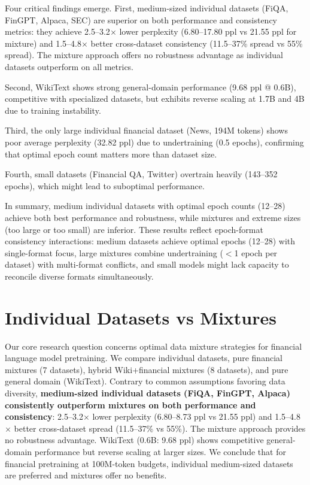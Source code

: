 Four critical findings emerge. First, {medium-sized individual datasets (FiQA, FinGPT, Alpaca, SEC) are superior on both performance and consistency metrics}: they achieve 2.5–3.2$\times$ lower perplexity (6.80–17.80 ppl vs 21.55 ppl for mixture) and 1.5–4.8$\times$ better cross-dataset consistency (11.5–37\% spread vs 55\% spread). The mixture approach offers no robustness advantage as individual datasets outperform on all metrics. 

Second, WikiText shows strong general-domain performance (9.68 ppl @ 0.6B), competitive with specialized datasets, but exhibits reverse scaling at 1.7B and 4B due to training instability. 

Third, the only large individual financial dataset (News, 194M tokens) shows poor average perplexity (32.82 ppl) due to undertraining (0.5 epochs), confirming that optimal epoch count matters more than dataset size. 

Fourth, small datasets (Financial QA, Twitter) overtrain heavily (143–352 epochs), which might lead to suboptimal performance. 

In summary, medium individual datasets with optimal epoch counts (12–28) achieve both best performance and robustness, while mixtures and extreme sizes (too large or too small) are inferior. These results reflect epoch-format consistency interactions: medium datasets achieve optimal epochs (12–28) with single-format focus, large mixtures combine undertraining ($<$1 epoch per dataset) with multi-format conflicts, and small models might lack capacity to reconcile diverse formats simultaneously.

\section{Individual Datasets vs Mixtures}

Our core research question concerns optimal data mixture strategies for financial language model pretraining. We compare individual datasets, pure financial mixtures (7 datasets), hybrid Wiki+financial mixtures (8 datasets), and pure general domain (WikiText). Contrary to common assumptions favoring data diversity, \textbf{medium-sized individual datasets (FiQA, FinGPT, Alpaca) consistently outperform mixtures on both performance and consistency}: 2.5–3.2$\times$ lower perplexity (6.80–8.73 ppl vs 21.55 ppl) and 1.5–4.8$\times$ better cross-dataset spread (11.5–37\% vs 55\%). The mixture approach provides no robustness advantage. WikiText (0.6B: 9.68 ppl) shows competitive general-domain performance but reverse scaling at larger sizes. We conclude that for financial pretraining at 100M-token budgets, individual medium-sized datasets are preferred and mixtures offer no benefits.

